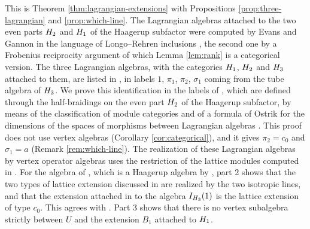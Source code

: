 \documentclass[leqno]{article}
\let\cal\relax
\newcommand{\cal}{\mathcal}
\numberwithin{equation}{section}
\begin{document}
This is Theorem \ref{thm:lagrangian-extensions} with Propositions \ref{prop:three-lagrangian} and \ref{prop:which-line}. The Lagrangian algebras attached to the two even parts $\cal H_2$ and $\cal H_1$ of the Haagerup subfactor were computed by Evans and Gannon in the language of Longo--Rehren inclusions \cite[pp.~18--19]{EvG11}, the second one by a Frobenius reciprocity argument of which Lemma \ref{lem:rank} is a categorical version. The three Lagrangian algebras, with the categories $\cal H_1$, $\cal H_2$ and $\cal H_3$ attached to them, are listed in \cite[(A8) p.~7 and pp.~3--4]{AHKZ26}, in labels $1$, $\pi_1$, $\pi_2$, $\sigma_1$ coming from the tube algebra of $\cal H_3$. We prove this identification in the labels of \cite{EvG11}, which are defined through the half-braidings on the even part $\cal H_2$ of the Haagerup subfactor, by means of the classification of module categories \cite{GrS12} and of a formula of Ostrik for the dimensions of the spaces of morphisms between Lagrangian algebras \cite[Remark 2.19 pp.~7--8]{Ost15}. This proof does not use vertex algebras (Corollary \ref{cor:categorical}), and it gives $\pi_2 = c_0$ and $\sigma_1 = a$ (Remark \ref{rem:which-line}). The realization of these Lagrangian algebras by vertex operator algebras uses the restriction of the lattice modules computed in \cite[Lemma 4.3]{Arh26}. For the algebra of \cite{Hua26}, which is a Haagerup algebra by \cite[Theorem 7.13(1)]{ArhIII}, part 2 shows that the two types of lattice extension discussed in \cite[Section 7 p.~10]{Hua26} are realized by the two isotropic lines, and that the extension attached in \cite[Section 7 pp.~9--10]{Hua26} to the algebra $I_{\cal H_3}(1)$ is the lattice extension of type $c_0$. This agrees with \cite[Remark 2.1]{Arh26}. Part 3 shows that there is no vertex subalgebra strictly between $U$ and the extension $B_1$ attached to $\cal H_1$.
\end{document}
